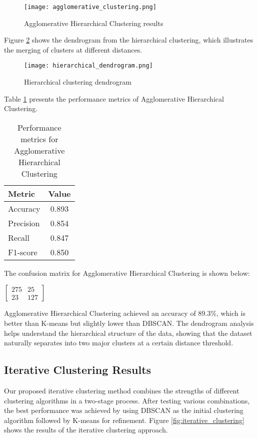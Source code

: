 \begin{figure}[h]
    \centering
    \texttt{[image: agglomerative\_clustering.png]}
    \caption{Agglomerative Hierarchical Clustering results}
    \label{fig:agglomerative_clustering}
\end{figure}

Figure \ref{fig:hierarchical_dendrogram} shows the dendrogram from the hierarchical clustering, which illustrates the merging of clusters at different distances.

\begin{figure}[h]
    \centering
    \texttt{[image: hierarchical\_dendrogram.png]}
    \caption{Hierarchical clustering dendrogram}
    \label{fig:hierarchical_dendrogram}
\end{figure}

Table \ref{tab:agglomerative_performance} presents the performance metrics of Agglomerative Hierarchical Clustering.

\begin{table}[h]
    \centering
    \caption{Performance metrics for Agglomerative Hierarchical Clustering}
    \label{tab:agglomerative_performance}
    \begin{tabular}{lc}
        \toprule
        Metric & Value \\
        \midrule
        Accuracy & 0.893 \\
        Precision & 0.854 \\
        Recall & 0.847 \\
        F1-score & 0.850 \\
        \bottomrule
    \end{tabular}
\end{table}

The confusion matrix for Agglomerative Hierarchical Clustering is shown below:
\begin{center}
$\begin{bmatrix}
275 & 25 \\
23 & 127
\end{bmatrix}$
\end{center}

Agglomerative Hierarchical Clustering achieved an accuracy of 89.3\%, which is better than K-means but slightly lower than DBSCAN. The dendrogram analysis helps understand the hierarchical structure of the data, showing that the dataset naturally separates into two major clusters at a certain distance threshold.

\subsection{Iterative Clustering Results}
Our proposed iterative clustering method combines the strengths of different clustering algorithms in a two-stage process. After testing various combinations, the best performance was achieved by using DBSCAN as the initial clustering algorithm followed by K-means for refinement. Figure \ref{fig:iterative_clustering} shows the results of the iterative clustering approach.


